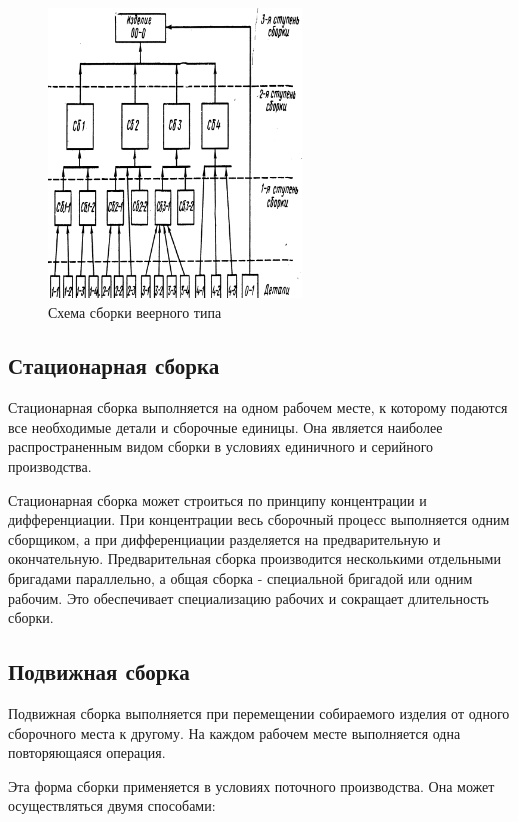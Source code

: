 \documentclass[unicode, 12pt, a4paper, oneside]{article}
\begin{document}
\begin{figure}[htbp]
\centering
\includegraphics[width=0.6\textwidth]{95_scheme_fan.png}
\caption{Схема сборки веерного типа}
\label{fig:95_scheme_fan}
\end{figure}

\subsection*{Стационарная сборка}

Стационарная сборка выполняется на одном рабочем месте, к которому подаются все необходимые детали и сборочные единицы. Она является наиболее распространенным видом сборки в условиях единичного и серийного производства.

Стационарная сборка может строиться по принципу концентрации и дифференциации. При концентрации весь сборочный процесс выполняется одним сборщиком, а при дифференциации разделяется на предварительную и окончательную. Предварительная сборка производится несколькими отдельными бригадами параллельно, а общая сборка - специальной бригадой или одним рабочим. Это обеспечивает специализацию рабочих и сокращает длительность сборки.

\subsection*{Подвижная сборка}

Подвижная сборка выполняется при перемещении собираемого изделия от одного сборочного места к другому. На каждом рабочем месте выполняется одна повторяющаяся операция.

Эта форма сборки применяется в условиях поточного производства. Она может осуществляться двумя способами:
\end{document}
